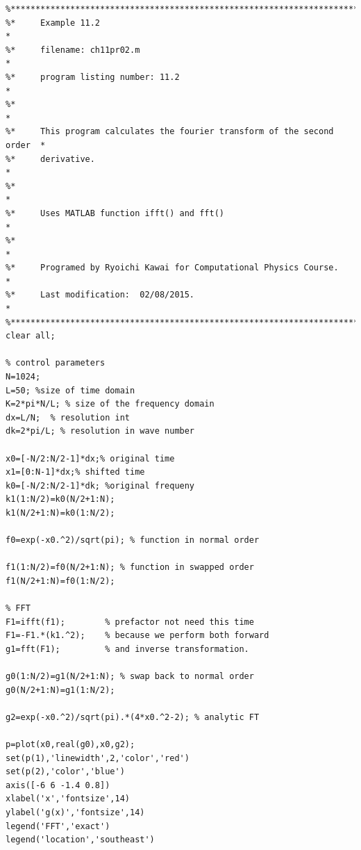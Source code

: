 \bigskip
\noindent
\program
\label{prog:fft_laplace}
\footnotesize
\begin{verbatim}
%**************************************************************************
%*     Example 11.2                                                       *
%*     filename: ch11pr02.m                                               *
%*     program listing number: 11.2                                       *
%*                                                                        *
%*     This program calculates the fourier transform of the second order  *
%*     derivative.                                                        *
%*                                                                        *
%*     Uses MATLAB function ifft() and fft()                              *
%*                                                                        *
%*     Programed by Ryoichi Kawai for Computational Physics Course.       *
%*     Last modification:  02/08/2015.                                    *
%**************************************************************************
clear all;

% control parameters
N=1024;
L=50; %size of time domain
K=2*pi*N/L; % size of the frequency domain
dx=L/N;  % resolution int
dk=2*pi/L; % resolution in wave number

x0=[-N/2:N/2-1]*dx;% original time
x1=[0:N-1]*dx;% shifted time
k0=[-N/2:N/2-1]*dk; %original frequeny 
k1(1:N/2)=k0(N/2+1:N);
k1(N/2+1:N)=k0(1:N/2);

f0=exp(-x0.^2)/sqrt(pi); % function in normal order

f1(1:N/2)=f0(N/2+1:N); % function in swapped order
f1(N/2+1:N)=f0(1:N/2);

% FFT
F1=ifft(f1);        % prefactor not need this time
F1=-F1.*(k1.^2);    % because we perform both forward
g1=fft(F1);         % and inverse transformation.

g0(1:N/2)=g1(N/2+1:N); % swap back to normal order
g0(N/2+1:N)=g1(1:N/2);

g2=exp(-x0.^2)/sqrt(pi).*(4*x0.^2-2); % analytic FT

p=plot(x0,real(g0),x0,g2);
set(p(1),'linewidth',2,'color','red')
set(p(2),'color','blue')
axis([-6 6 -1.4 0.8])
xlabel('x','fontsize',14)
ylabel('g(x)','fontsize',14)
legend('FFT','exact')
legend('location','southeast')
\end{verbatim}
\normalsize

